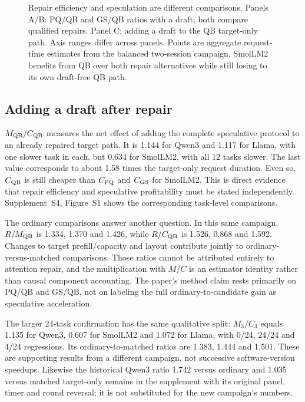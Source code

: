 \begin{figure}[t]
\centering
\caption{Repair efficiency and speculation are different comparisons. Panels A/B: PQ/QB and GS/QB ratios with a draft; both compare qualified repairs. Panel C: adding a draft to the QB target-only path. Axis ranges differ across panels. Points are aggregate request-time estimates from the balanced two-session campaign. SmolLM2 benefits from QB over both repair alternatives while still losing to its own draft-free QB path.}
\label{fig:costfig}
\end{figure}

\subsection{Adding a draft after repair}
$M_{\mathrm{QB}}/C_{\mathrm{QB}}$ measures the net effect of adding the complete speculative protocol to an already repaired target path. It is 1.144 for Qwen3 and 1.117 for Llama, with one slower task in each, but 0.634 for SmolLM2, with all 12 tasks slower. The last value corresponds to about 1.58 times the target-only request duration. Even so, $C_{\mathrm{QB}}$ is still cheaper than $C_{\mathrm{PQ}}$ and $C_{\mathrm{GS}}$ for SmolLM2. This is direct evidence that repair efficiency and speculative profitability must be stated independently. Supplement~S4, Figure~S1 shows the corresponding task-level comparisons.

The ordinary comparisons answer another question. In this same campaign, $R/M_{\mathrm{QB}}$ is 1.334, 1.370 and 1.426, while $R/C_{\mathrm{QB}}$ is 1.526, 0.868 and 1.592. Changes to target prefill/capacity and layout contribute jointly to ordinary-versus-matched comparisons. Those ratios cannot be attributed entirely to attention repair, and the multiplication with $M/C$ is an estimator identity rather than causal component accounting. The paper's method claim rests primarily on PQ/QB and GS/QB, not on labeling the full ordinary-to-candidate gain as speculative acceleration.

The larger 24-task confirmation has the same qualitative split: $M_3/C_3$ equals 1.135 for Qwen3, 0.607 for SmolLM2 and 1.072 for Llama, with 0/24, 24/24 and 4/24 regressions. Its ordinary-to-matched ratios are 1.383, 1.444 and 1.501. These are supporting results from a different campaign, not successive software-version speedups. Likewise the historical Qwen3 ratio 1.742 versus ordinary and 1.035 versus matched target-only remains in the supplement with its original panel, timer and round reversal; it is not substituted for the new campaign's numbers.

